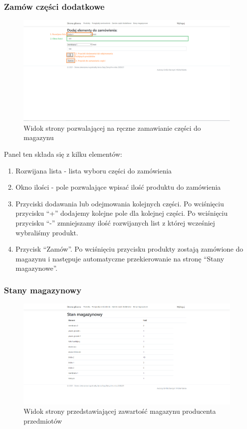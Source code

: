 \documentclass{article}
\begin{document}
\subsubsection{Zamów części dodatkowe}
\begin{figure}[H]
   \centering
   \includegraphics[width=0.99\textwidth,frame]{Wyglad/czesci_dodatkowe_admin.png}
   \caption{Widok strony pozwalającej na ręczne zamawianie części do magazynu}
\end{figure}
Panel ten składa się z kilku elementów:
\begin{enumerate}
   \item Rozwijana lista - lista wyboru części do zamówienia
   \item Okno ilości - pole pozwalające wpisać ilość produktu do zamówienia
   \item Przyciski dodawania lub odejmowania kolejnych części. Po wciśnięciu przycisku ``+''
   dodajemy kolejne pole dla kolejnej części. Po wciśnięciu przycisku ``-'' zmniejszamy ilość
   rozwijanych list z której wcześniej wybraliśmy produkt.
   \item Przycisk ``Zamów''. Po wciśnięciu przycisku produkty zostają zamówione do magazynu i
   następuje automatyczne przekierowanie na stronę ``Stany magazynowe''.
\end{enumerate}

\subsubsection{Stany magazynowy}
\begin{figure}[H]
   \centering
   \includegraphics[width=0.99\textwidth,frame]{Wyglad/magazyn_admin.png}
   \caption{Widok strony przedstawiającej zawartość magazynu producenta przedmiotów}
\end{figure}
\end{document}
